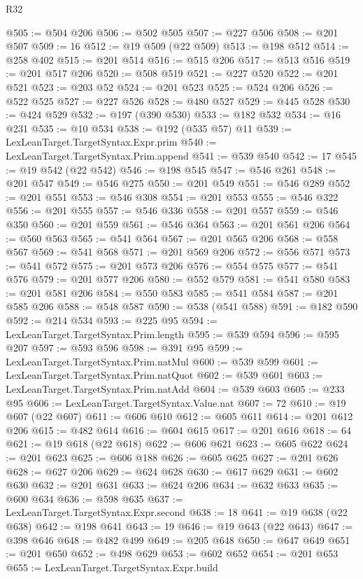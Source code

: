 \begin{lexlean}{R32}
\begin{coremodule}
@505 := @504 @206
@506 := @502 @505
@507 := @227 @506
@508 := @201 @507
@509 := 16
@512 := @19 @509 (@22 @509)
@513 := @198 @512
@514 := @258 @402
@515 := @201 @514
@516 := @515 @206
@517 := @513 @516
@519 := @201 @517 @206
@520 := @508 @519
@521 := @227 @520
@522 := @201 @521
@523 := @203 @52
@524 := @201 @523
@525 := @524 @206
@526 := @522 @525
@527 := @227 @526
@528 := @480 @527
@529 := @445 @528
@530 := @424 @529
@532 := @197 (@390 @530)
@533 := @182 @532
@534 := @16 @231
@535 := @10 @534
@538 := @192 (@535 @57) @11
@539 := LexLeanTarget.TargetSyntax.Expr.prim
@540 := LexLeanTarget.TargetSyntax.Prim.append
@541 := @539 @540
@542 := 17
@545 := @19 @542 (@22 @542)
@546 := @198 @545
@547 := @546 @261
@548 := @201 @547
@549 := @546 @275
@550 := @201 @549
@551 := @546 @289
@552 := @201 @551
@553 := @546 @308
@554 := @201 @553
@555 := @546 @322
@556 := @201 @555
@557 := @546 @336
@558 := @201 @557
@559 := @546 @350
@560 := @201 @559
@561 := @546 @364
@563 := @201 @561 @206
@564 := @560 @563
@565 := @541 @564
@567 := @201 @565 @206
@568 := @558 @567
@569 := @541 @568
@571 := @201 @569 @206
@572 := @556 @571
@573 := @541 @572
@575 := @201 @573 @206
@576 := @554 @575
@577 := @541 @576
@579 := @201 @577 @206
@580 := @552 @579
@581 := @541 @580
@583 := @201 @581 @206
@584 := @550 @583
@585 := @541 @584
@587 := @201 @585 @206
@588 := @548 @587
@590 := @538 (@541 @588)
@591 := @182 @590
@592 := @214 @534
@593 := @225 @95
@594 := LexLeanTarget.TargetSyntax.Prim.length
@595 := @539 @594
@596 := @595 @207
@597 := @593 @596
@598 := @391 @95
@599 := LexLeanTarget.TargetSyntax.Prim.natMul
@600 := @539 @599
@601 := LexLeanTarget.TargetSyntax.Prim.natQuot
@602 := @539 @601
@603 := LexLeanTarget.TargetSyntax.Prim.natAdd
@604 := @539 @603
@605 := @233 @95
@606 := LexLeanTarget.TargetSyntax.Value.nat
@607 := 72
@610 := @19 @607 (@22 @607)
@611 := @606 @610
@612 := @605 @611
@614 := @201 @612 @206
@615 := @482 @614
@616 := @604 @615
@617 := @201 @616
@618 := 64
@621 := @19 @618 (@22 @618)
@622 := @606 @621
@623 := @605 @622
@624 := @201 @623
@625 := @606 @188
@626 := @605 @625
@627 := @201 @626
@628 := @627 @206
@629 := @624 @628
@630 := @617 @629
@631 := @602 @630
@632 := @201 @631
@633 := @624 @206
@634 := @632 @633
@635 := @600 @634
@636 := @598 @635
@637 := LexLeanTarget.TargetSyntax.Expr.second
@638 := 18
@641 := @19 @638 (@22 @638)
@642 := @198 @641
@643 := 19
@646 := @19 @643 (@22 @643)
@647 := @398 @646
@648 := @482 @499
@649 := @205 @648
@650 := @647 @649
@651 := @201 @650
@652 := @498 @629
@653 := @602 @652
@654 := @201 @653
@655 := LexLeanTarget.TargetSyntax.Expr.build

\end{coremodule}
\end{lexlean}
